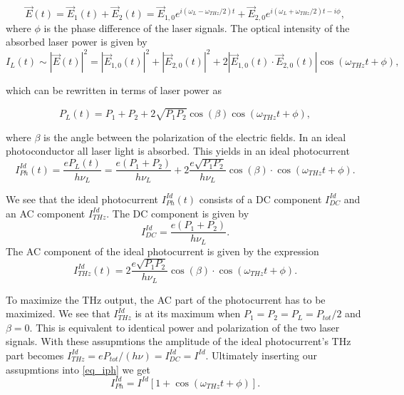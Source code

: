 \begin{equation}
	\vec{E}(t) = \vec{E}_1(t) + \vec{E}_2(t) = \vec{E}_{1,0}e^{i(\omega_L - \omega_{THz}/2)t} + \vec{E}_{2,0}e^{i(\omega_L + \omega_{THz}/2)t - i\phi},
\end{equation}
where $\phi$ is the phase difference of the laser signals. The optical intensity of the absorbed laser power is given by 
\begin{equation}
	I_L(t) \sim |\vec{E}(t)|^2 = |\vec{E}_{1,0}(t)|^2 + |\vec{E}_{2,0}(t)|^2 + 2|\vec{E}_{1,0}(t) \cdot \vec{E}_{2,0}(t)|\cos(\omega_{THz}t + \phi), 
\end{equation}

which can be rewritten in terms of laser power as 

\begin{equation}
	P_L(t) = P_1 + P_2 + 2\sqrt{P_1 P_2}\cos(\beta)\cos(\omega_{THz}t + \phi), 
\end{equation}

where $\beta$ is the angle between the polarization of the electric fields. In an ideal photoconductor all laser light is absorbed. This yields in an ideal photocurrent 
\begin{equation}
	I_{Ph}^{Id}(t) = \frac{eP_L(t)}{h\nu_L} = \frac{e(P_1+P_2)}{h\nu_L} + 2\frac{e\sqrt{P_1P_2}}{h\nu_L}\cos(\beta)\cdot\cos(\omega_{THz}t + \phi).
	\label{eq_iph}
\end{equation}

We see that the ideal photocurrent $I_{Ph}^{Id}(t)$ consists of a DC component $I_{DC}^{Id}$ and an AC component $I_{THz}^{Id}$.
The DC component is given by 
\begin{equation}
	I_{DC}^{Id} = \frac{e(P_1+P_2)}{h\nu_L}.
\end{equation} 
The AC component of the ideal photocurrent is given by the expression
\begin{equation}
	I_{THz}^{Id}(t) = 2\frac{e\sqrt{P_1P_2}}{h\nu_L}\cos(\beta)\cdot\cos(\omega_{THz}t + \phi).
\end{equation}

To maximize the THz output, the AC part of the photocurrent has to be maximized. We see that $I_{THz}^{Id}$ is at its maximum when $P_1 = P_2 = P_L = P_{tot} / 2$ and $\beta = 0$. This is equivalent to identical power and polarization of the two laser signals. With these assupmtions the amplitude of the ideal photocurrent's THz part becomes $I_{THz}^{Id} = eP_{tot} / (h\nu) = I_{DC}^{Id} = I^{Id}$. Ultimately inserting our assupmtions into \ref{eq_iph} we get 
\begin{equation}
	I_{Ph}^{Id} = I^{Id}[1 + \cos(\omega_{THz}t + \phi)].
\end{equation}

